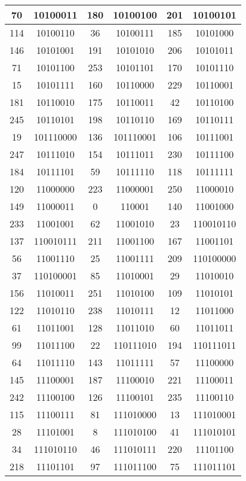 \documentclass[conference,onecolumn,12pt]{IEEEtran}
\numberwithin{equation}{subsection}
\begin{document}
\begin{table}[h]
\begin{tabular}{cccccc}
70 & 10100011 & 180 & 10100100 & 201 & 10100101 \\ \hline
114 & 10100110 & 36 & 10100111 & 185 & 10101000 \\ \hline
146 & 10101001 & 191 & 10101010 & 206 & 10101011 \\ \hline
71 & 10101100 & 253 & 10101101 & 170 & 10101110 \\ \hline
15 & 10101111 & 160 & 10110000 & 229 & 10110001 \\ \hline
181 & 10110010 & 175 & 10110011 & 42 & 10110100 \\ \hline
245 & 10110101 & 198 & 10110110 & 169 & 10110111 \\ \hline
19 & 101110000 & 136 & 101110001 & 106 & 10111001 \\ \hline
247 & 10111010 & 154 & 10111011 & 230 & 10111100 \\ \hline
184 & 10111101 & 59 & 10111110 & 118 & 10111111 \\ \hline
120 & 11000000 & 223 & 11000001 & 250 & 11000010 \\ \hline
149 & 11000011 & 0 & 110001 & 140 & 11001000 \\ \hline
233 & 11001001 & 62 & 11001010 & 23 & 110010110 \\ \hline
137 & 110010111 & 211 & 11001100 & 167 & 11001101 \\ \hline
56 & 11001110 & 25 & 11001111 & 209 & 110100000 \\ \hline
37 & 110100001 & 85 & 11010001 & 29 & 11010010 \\ \hline
156 & 11010011 & 251 & 11010100 & 109 & 11010101 \\ \hline
122 & 11010110 & 238 & 11010111 & 12 & 11011000 \\ \hline
61 & 11011001 & 128 & 11011010 & 60 & 11011011 \\ \hline
99 & 11011100 & 22 & 110111010 & 194 & 110111011 \\ \hline
64 & 11011110 & 143 & 11011111 & 57 & 11100000 \\ \hline
145 & 11100001 & 187 & 11100010 & 221 & 11100011 \\ \hline
242 & 11100100 & 126 & 11100101 & 235 & 11100110 \\ \hline
115 & 11100111 & 81 & 111010000 & 13 & 111010001 \\ \hline
28 & 11101001 & 8 & 111010100 & 41 & 111010101 \\ \hline
34 & 111010110 & 46 & 111010111 & 220 & 11101100 \\ \hline
218 & 11101101 & 97 & 111011100 & 75 & 111011101 \\ \hline

\end{tabular}
\end{table}
\end{document}
